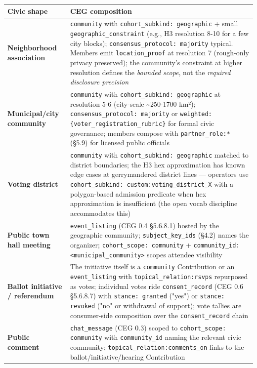 \documentclass[10pt]{article}
\begin{document}
{\footnotesize
\begin{longtable}{|p{8.0cm}|p{8.0cm}|}\hline
\textbf{Civic shape} & \textbf{CEG composition} \\ \hline\endhead
\textbf{Neighborhood association} & \texttt{community} with \texttt{cohort\_subkind: geographic} + small \texttt{geographic\_constraint} (e.g., H3 resolution 8-10 for a few city blocks); \texttt{consensus\_protocol: majority} typical. Members emit \texttt{location\_proof} at resolution 7 (rough-only privacy preserved); the community's constraint at higher resolution defines the \textit{bounded scope}, not the \textit{required disclosure precision} \\ \hline
\textbf{Municipal/city community} & \texttt{community} with \texttt{cohort\_subkind: geographic} at resolution 5-6 (city-scale \textasciitilde{}250-1700 km²); \texttt{consensus\_protocol: majority} or \texttt{weighted:\{voter\_registration\_rubric\}} for formal civic governance; members compose with \texttt{partner\_role:*} (§5.9) for licensed public officials \\ \hline
\textbf{Voting district} & \texttt{community} with \texttt{cohort\_subkind: geographic} matched to district boundaries; the H3 hex approximation has known edge cases at gerrymandered district lines — operators use \texttt{cohort\_subkind: custom:voting\_district\_X} with a polygon-based admission predicate when hex approximation is insufficient (the open vocab discipline accommodates this) \\ \hline
\textbf{Public town hall meeting} & \texttt{event\_listing} (CEG 0.4 §5.6.8.1) hosted by the geographic community; \texttt{subject\_key\_ids} (§4.2) names the organizer; \texttt{cohort\_scope: community} + \texttt{community\_id: <municipal\_community>} scopes attendee visibility \\ \hline
\textbf{Ballot initiative / referendum} & The initiative itself is a \texttt{community} Contribution or an \texttt{event\_listing} with \texttt{topical\_relation:rsvps} repurposed as votes; individual votes ride \texttt{consent\_record} (CEG 0.6 §5.6.8.7) with \texttt{stance: granted} ("yes") or \texttt{stance: revoked} ("no" or withdrawal of support); vote tallies are consumer-side composition over the \texttt{consent\_record} chain \\ \hline
\textbf{Public comment} & \texttt{chat\_message} (CEG 0.3) scoped to \texttt{cohort\_scope: community} with \texttt{community\_id} naming the relevant civic community; \texttt{topical\_relation:comments\_on} links to the ballot/initiative/hearing Contribution \\ \hline

\end{longtable}}
\end{document}
